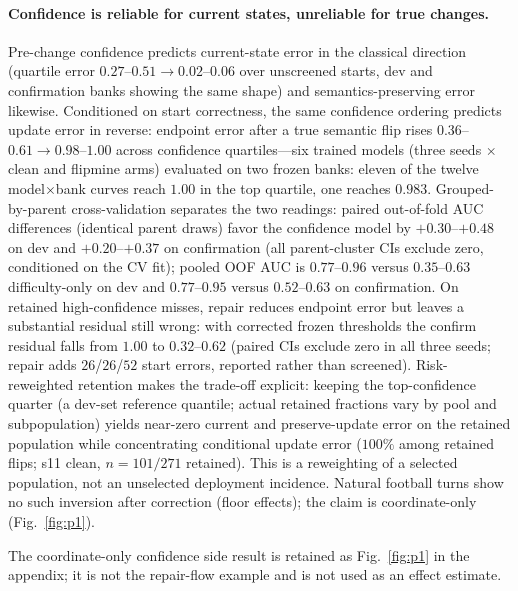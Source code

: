 \paragraph{Confidence is reliable for current states, unreliable for true
changes.} Pre-change confidence predicts current-state error in the
classical direction (quartile error $0.27$--$0.51 \to 0.02$--$0.06$ over
unscreened starts, dev and confirmation banks showing the same shape) and
semantics-preserving error likewise. Conditioned on start correctness, the
same confidence ordering predicts update error in reverse: endpoint error
after a true semantic flip rises $0.36$--$0.61 \to 0.98$--$1.00$ across
confidence quartiles---six trained models (three seeds $\times$ clean and
flipmine arms) evaluated on two frozen banks: eleven of the twelve
model$\times$bank curves reach $1.00$ in the top quartile, one reaches
$0.983$. Grouped-by-parent cross-validation separates the two readings:
paired out-of-fold AUC differences (identical parent draws) favor the
confidence model by $+0.30$--$+0.48$ on dev and $+0.20$--$+0.37$ on
confirmation (all parent-cluster CIs exclude zero, conditioned on the CV
fit); pooled OOF AUC is $0.77$--$0.96$ versus $0.35$--$0.63$ difficulty-only
on dev and $0.77$--$0.95$ versus $0.52$--$0.63$ on confirmation.
On retained high-confidence misses, repair reduces endpoint error but
leaves a substantial residual still wrong: with corrected frozen thresholds the
confirm residual falls from $1.00$ to $0.32$--$0.62$ (paired CIs exclude zero
in all three seeds; repair adds $26$/$26$/$52$ start errors, reported rather
than screened).
Risk-reweighted retention makes the trade-off explicit: keeping the
top-confidence quarter (a dev-set reference quantile; actual retained
fractions vary by pool and subpopulation) yields near-zero current and
preserve-update error on the retained population while concentrating
conditional update error ($100\%$ among retained flips; s11 clean,
$n{=}101/271$ retained). This is a reweighting of a selected population,
not an unselected deployment incidence. Natural football turns show no such
inversion after correction (floor effects); the claim is coordinate-only
(Fig.~\ref{fig:p1}).

The coordinate-only confidence side result is retained as
Fig.~\ref{fig:p1} in the appendix; it is not the repair-flow example and is
not used as an effect estimate.

